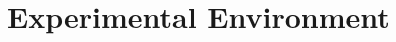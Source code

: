 \documentclass[12pt,conference,letterpaper]{IEEEtran}
\begin{document}
   
   
   
   
   
   







\section{Experimental Environment}
\label{sec:exen}
\end{document}
